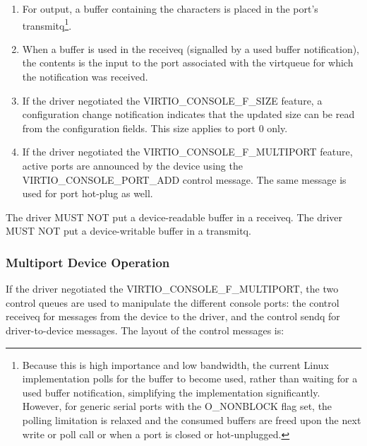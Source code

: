 \begin{enumerate}
\item For output, a buffer containing the characters is placed in
  the port's transmitq\footnote{Because this is high importance and low bandwidth, the current
Linux implementation polls for the buffer to become used, rather than
waiting for a used buffer notification, simplifying the implementation
significantly. However, for generic serial ports with the
O_NONBLOCK flag set, the polling limitation is relaxed and the
consumed buffers are freed upon the next write or poll call or
when a port is closed or hot-unplugged.
}.

\item When a buffer is used in the receiveq (signalled by a
  used buffer notification), the contents is the input to the port associated
  with the virtqueue for which the notification was received.

\item If the driver negotiated the VIRTIO_CONSOLE_F_SIZE feature, a
  configuration change notification indicates that the updated size can
  be read from the configuration fields.  This size applies to port 0 only.

\item If the driver negotiated the VIRTIO_CONSOLE_F_MULTIPORT
  feature, active ports are announced by the device using the
  VIRTIO_CONSOLE_PORT_ADD control message. The same message is
  used for port hot-plug as well.
\end{enumerate}


The driver MUST NOT put a device-readable buffer in a receiveq. The driver
MUST NOT put a device-writable buffer in a transmitq.

\subsubsection{Multiport Device Operation}\label{sec:Device Types / Console Device / Device Operation / Multiport Device Operation}

If the driver negotiated the VIRTIO_CONSOLE_F_MULTIPORT, the two
control queues are used to manipulate the different console ports: the
control receiveq for messages from the device to the driver, and the
control sendq for driver-to-device messages.  The layout of the
control messages is:

